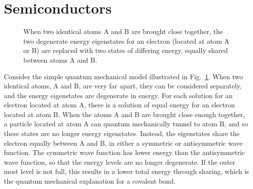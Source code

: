 \documentclass[12pt,oneside]{book}
\begin{document}
\section{Semiconductors}

\begin{figure}[htbp]
\begin{center}
\caption{When two identical atoms A and B are brought close together, the two degenerate energy eigenstates for an electron (located at atom A or B) are replaced with two states of differing energy, equally shared between atoms A and B.}
\label{fig:bond}
\end{center}
\end{figure}

Consider the simple quantum mechanical model illustrated in Fig.~\ref{fig:bond}.  When two identical atoms, A and B, are very far apart, they can be considered separately, and the energy eigenstates are degenerate in energy.  For each solution for an electron located at atom A, there is a solution of equal energy for an electron located at atom B.  When the atoms A and B are brought close enough together, a particle located at atom A can quantum mechanically tunnel to atom B, and so these states are no longer energy eigenstates.  Instead, the eigenstates share the electron equally between A and B, in either a symmetric or antisymmetric wave function.  The symmetric wave function has lower energy than the antisymmetric wave function, so that the energy levels are no longer degenerate.  If the outer most level is not full, this results in a lower total energy through sharing, which is the quantum mechanical explanation for a covalent bond.
\end{document}
